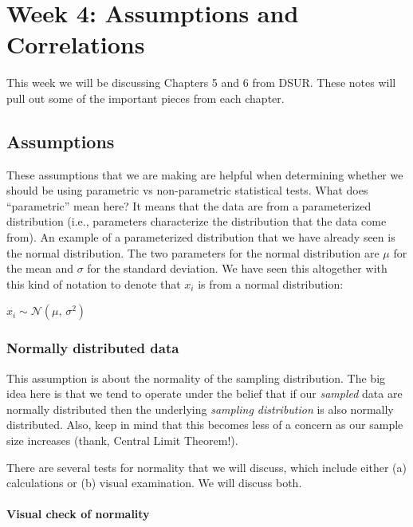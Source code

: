 \documentclass[
]{book}
\begin{document}
\hypertarget{week-4-assumptions-and-correlations}{%
\chapter{Week 4: Assumptions and Correlations}\label{week-4-assumptions-and-correlations}}

This week we will be discussing Chapters 5 and 6 from DSUR. These notes will pull out some of the important pieces from each chapter.

\hypertarget{assumptions}{%
\section{Assumptions}\label{assumptions}}

These assumptions that we are making are helpful when determining whether we should be using parametric vs non-parametric statistical tests. What does ``parametric'' mean here? It means that the data are from a parameterized distribution (i.e., parameters characterize the distribution that the data come from). An example of a parameterized distribution that we have already seen is the normal distribution. The two parameters for the normal distribution are \(\mu\) for the mean and \(\sigma\) for the standard deviation. We have seen this altogether with this kind of notation to denote that \(x_i\) is from a normal distribution:

\(x_i \sim \mathcal{N} (\mu, \,\sigma^{2})\)

\hypertarget{normally-distributed-data}{%
\subsection{Normally distributed data}\label{normally-distributed-data}}

This assumption is about the normality of the sampling distribution. The big idea here is that we tend to operate under the belief that if our \emph{sampled} data are normally distributed then the underlying \emph{sampling distribution} is also normally distributed. Also, keep in mind that this becomes less of a concern as our sample size increases (thank, Central Limit Theorem!).

There are several tests for normality that we will discuss, which include either (a) calculations or (b) visual examination. We will discuss both.

\hypertarget{visual-check-of-normality}{%
\subsubsection{Visual check of normality}\label{visual-check-of-normality}}
\end{document}
